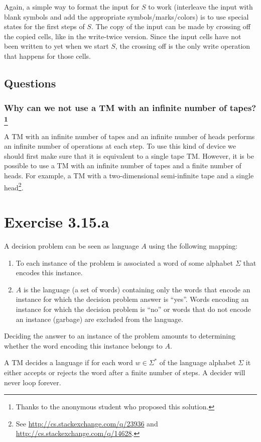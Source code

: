 \documentclass{article}
\newcommand{\0}{\texttt{\textvisiblespace}}
\newcommand{\°}{\obullet{\0}}
\newcommand{\TM}{TM}
\begin{document}
Again, a simple way to format the input for \(S\) to work
(interleave the input with blank symbols and add the
appropriate symbols/marks/colors) is to use special states for the
first steps of \(S\). The copy of the input can be made by crossing off the copied
cells, like in the write-twice version. Since the input cells have not been
written to yet when we start \(S\), the crossing off is the only write
operation that happens for those cells.


\subsection{Questions}
\subsubsection{Why can we not use a \TM{} with an infinite number of
tapes?\footnote{Thanks to the anonymous student who proposed this solution.}}
A \TM{} with an infinite number of tapes and an infinite number of heads
performs an infinite number of operations at each step.
To use this kind of device we should first make sure that it is equivalent to a single
tape \TM{}.
However, it is be possible to use a \TM{} with an infinite number of tapes
and a finite number of heads. For example, a \TM{} with a two-dimensional
semi-infinite tape and a single head\footnote{See
\url{http://cs.stackexchange.com/q/23936}
and
\url{http://cs.stackexchange.com/q/14628}.}.

\section{Exercise 3.15.a}
A decision problem can be seen as language \(A\) using the following mapping:
\begin{enumerate}
	\item To each instance of the problem is associated a word of some alphabet
		\(\Sigma\) that encodes this instance.
	\item \(A\) is the language (a set of words) containing only
		the words that encode an instance for
		which the decision problem answer is ``yes''. Words encoding an
		instance for which the decision problem is ``no'' or words that do not
		encode an instance (garbage) are excluded from the language.
\end{enumerate}
Deciding the answer to an instance of the problem amounts to determining
whether the word encoding this instance belongs to \(A\).

A \TM{} decides a language if for each word \(w \in \Sigma^{*}\)
of the language alphabet \(\Sigma\)
it either accepts or rejects the word after a finite number of steps. A decider
will never loop forever.
\end{document}
